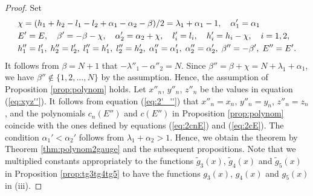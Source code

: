 \documentclass[12pt]{amsart}
\numberwithin{equation}{section}
\theoremstyle{definition}
\theoremstyle{remark}
\begin{document}
\begin{proof}
Set
\begin{align}
    &\chi = (h_{1} + h_{2} - l_{1} - l_{2} + \alpha_{1} - \alpha_{2} - \beta )/2  = \lambda _{1} + \alpha _{1} - 1 , \quad \alpha '_{1} = \alpha _{1} \label{eq:2'_''} \\
    &E' = E, \quad \beta ' = -\beta - \chi, \quad \alpha '_{2} = \alpha_{2} + \chi, \quad  l'_{i} = l_{i}, \quad h'_{i} = h_{i} - \chi, \quad i = 1, 2, \notag \\
& h''_{1} = l' _1, \; h''_{2} = l' _2, \;  l''_{1} = h' _1, \; l''_{2} = h' _2, \; \alpha ''_{1} = \alpha '_{1} , \; \alpha ''_{2} = \alpha '_{2} , \; \beta '' = - \beta ' , \;  E''=E'. \notag 
 \end{align}
It follows from $\beta = N +1$ that $-\lambda ''_1 - \alpha '' _2 = N $.
Since $\beta '' = \beta + \chi = N + \lambda _{1} + \alpha _{1}$, we have $\beta '' \not \in \{ 1,2,\dots ,N\}$ by the assumption.
Hence, the assumption of Proposition \ref{prop:polynom} holds.
Let $x''_n$, $y''_n $, $z''_n $ be the values in equation (\ref{eq:xyz''}).
It follows from equation (\ref{eq:2'_''}) that $x''_n= x_n$, $y''_n= y_n$, $z''_n= z_n$, and the polynomials  $c_{n} (E'')$ and $c (E'')$ in Proposition \ref{prop:polynom} coincide with the ones defined by equations (\ref{eq:2cnE}) and (\ref{eq:2cE}).
The condition $\alpha_{1}' < \alpha_{2}'$ follows from $ \lambda _{1} + \alpha _{2}  > 1$.
Hence, we obtain the theorem by Theorem \ref{thm:polynom2gauge} and the subsequent propositions.
Note that we multiplied constants appropriately to the functions $\tilde{g}_3(x)$,  $\tilde{g}_4(x)$ and $\tilde{g}_5(x)$ in Proposition \ref{prop:tg3tg4tg5} to have the functions $g_3(x)$,  $g_4(x)$ and $g_5(x)$ in (iii).
\end{proof}
\end{document}
